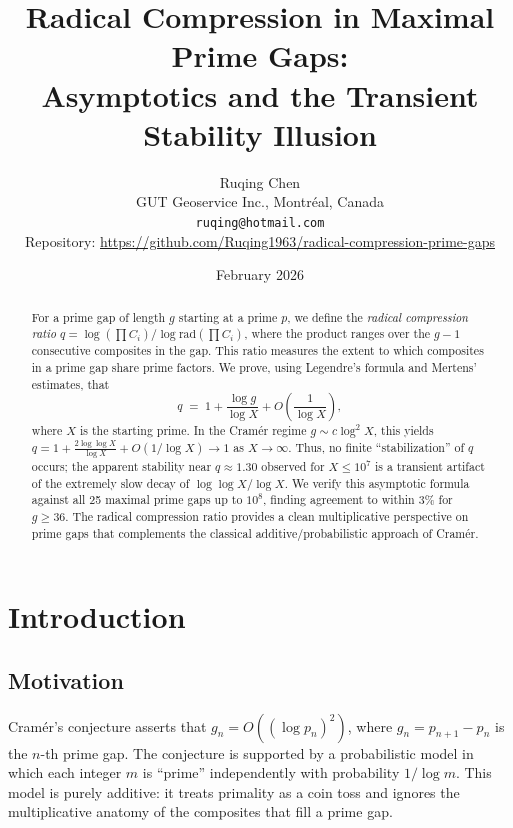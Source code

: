 \documentclass[11pt, a4paper]{article}
\title{\textbf{Radical Compression in Maximal Prime Gaps: \\
Asymptotics and the Transient Stability Illusion}}
\author{Ruqing Chen\\[4pt]
\small GUT Geoservice Inc., Montr\'eal, Canada\\[2pt]
\small \texttt{ruqing@hotmail.com}\\[2pt]
\small Repository:
\url{https://github.com/Ruqing1963/radical-compression-prime-gaps}}
\date{February 2026}
\theoremstyle{definition}
\theoremstyle{remark}
\newcommand{\rad}{\mathrm{rad}}
\begin{document}
\maketitle

\begin{abstract}
For a prime gap of length $g$ starting at a prime $p$,
we define the \emph{radical compression ratio}
$q = \log(\prod C_i) / \log \rad(\prod C_i)$,
where the product ranges over the $g - 1$ consecutive
composites in the gap.
This ratio measures the extent to which composites in a
prime gap share prime factors.
We prove, using Legendre's formula and Mertens' estimates,
that
\begin{equation*}
    q \;=\; 1 + \frac{\log g}{\log X} + O\!\left(\frac{1}{\log X}\right),
\end{equation*}
where $X$ is the starting prime.
In the Cram\'er regime $g \sim c\log^2 X$, this yields
$q = 1 + \frac{2\log\log X}{\log X} + O(1/\log X) \to 1$
as $X \to \infty$.
Thus, no finite ``stabilization'' of $q$ occurs;
the apparent stability near $q \approx 1.30$ observed for
$X \le 10^7$ is a transient artifact of the extremely slow
decay of $\log\log X / \log X$.
We verify this asymptotic formula against all 25
maximal prime gaps up to $10^8$, finding agreement to
within $3\%$ for $g \ge 36$.
The radical compression ratio provides a clean
multiplicative perspective on prime gaps that complements
the classical additive/probabilistic approach of Cram\'er.
\end{abstract}

\bigskip

\section{Introduction}\label{sec:intro}

\subsection{Motivation}

Cram\'er's conjecture \cite{Cramer1936} asserts that
$g_n = O((\log p_n)^2)$,
where $g_n = p_{n+1} - p_n$ is the $n$-th prime gap.
The conjecture is supported by a probabilistic model in
which each integer $m$ is ``prime'' independently with
probability $1/\log m$.
This model is purely additive: it treats primality as a
coin toss and ignores the multiplicative anatomy of the
composites that fill a prime gap.
\end{document}
